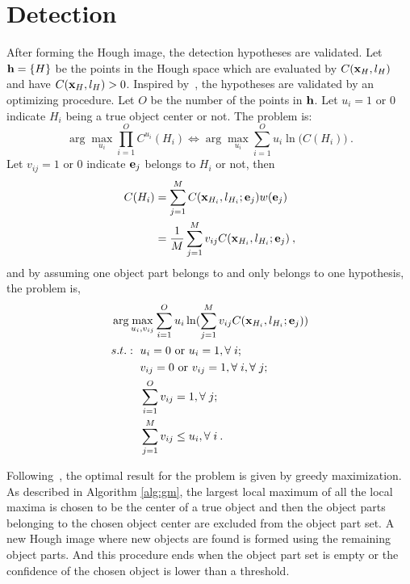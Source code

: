 \section{Detection}
\label{det4}
After forming the Hough image, the detection hypotheses are validated. Let ${\bf{h}}=\{ H \}$ be the points in the Hough space which are evaluated by $C({\bf{x}}_{H},l_{H})$ and have $C({\bf{x}}_{H},l_{H})>0$.  Inspired by~\citep{ac9}, the hypotheses are validated by an optimizing procedure. Let $O$ be the number of the points in ${\bf{h}}$. Let $u_i=1\mbox{ or } 0$ indicate $H_i$ being a true object center or not. The problem is:
\[
\arg \max\limits_{u_i} \prod\limits_{i = 1}^O { C^{u_i}({H_i})} \Longleftrightarrow\arg \max\limits_{u_i} \sum\limits_{i = 1}^O {{u_i}\ln (C({H_i})} )\:.
\]
Let $v_{ij}=1\mbox{ or } 0$ indicate ${\bf{e}}_j$ belongs to $H_i$ or not, then
\[
\begin{aligned}
C(H_i)&=\sum\limits^M_{j=1} C({\bf{x}}_{H_i},l_{H_i};{\bf{e}}_j)w({\bf{e}}_j)\\
&=\frac 1 M \sum\limits^M_{j=1} v_{ij} C({\bf{x}}_{H_i},l_{H_i};{\bf{e}}_j)\:,
\end{aligned}
\]
and by assuming one object part belongs to and only belongs to one hypothesis, the problem is,
\[
\begin{aligned}
&\arg \max\limits_{u_i,v_{ij}} \sum\limits_{i = 1}^O {{u_i}\ln (\sum\limits^M_{j=1} v_{ij} C({\bf{x}}_{H_i},l_{H_i};{\bf{e}}_j)} )\\
&
\begin{aligned}
    s.t.:\mbox{ }&u_i=0\mbox{ or }u_i=1,\forall\;i;\\
    &v_{ij}=0\mbox{ or }v_{ij}=1,\forall\;i,\forall\;j;\\
    &\sum\limits_{i = 1}^O {v_{ij}}=1,\forall\;j;\;\;  \\
    &\sum\limits_{j = 1}^M {v_{ij}}\leq u_i,\forall\;i\:.
\end{aligned}
\end{aligned}
\]


Following~\citep{ac9}, the optimal result for the problem is given by greedy maximization. As described in Algorithm \ref{alg:gm}, the largest local maximum of all the local maxima is chosen to be the center of a true object and then the object parts belonging to the chosen object center are excluded from the object part set. A new Hough image where new objects are found is formed using the remaining object parts. And this procedure ends when the object part set is empty or the confidence of the chosen object is lower than a threshold.

